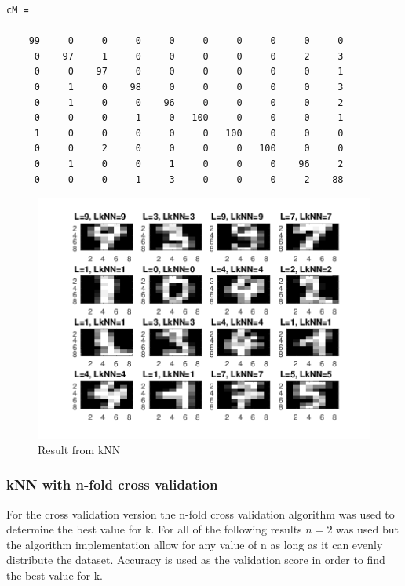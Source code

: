 \documentclass[a4paper,12pt]{article}
\begin{document}
\begin{verbatim}
cM =

    99     0     0     0     0     0     0     0     0     0
     0    97     1     0     0     0     0     0     2     3
     0     0    97     0     0     0     0     0     0     1
     0     1     0    98     0     0     0     0     0     3
     0     1     0     0    96     0     0     0     0     2
     0     0     0     1     0   100     0     0     0     1
     1     0     0     0     0     0   100     0     0     0
     0     0     2     0     0     0     0   100     0     0
     0     1     0     0     1     0     0     0    96     2
     0     0     0     1     3     0     0     0     2    88
\end{verbatim}

\begin{figure}[H]
\centering
\caption{Result from kNN}\label{fig:kNN-result}
  \begin{minipage}[]{1\textwidth}
  \includegraphics[width=\textwidth]{figures/kNN_simple.png}
  \end{minipage}
\end{figure}

\subsubsection{kNN with n-fold cross validation}

For the cross validation version the n-fold cross validation algorithm was used to determine the best value for k. For all of the following results $n = 2$ was used but the algorithm implementation allow for any value of n as long as it can evenly distribute the dataset. Accuracy is used as the validation score in order to find the best value for k.
\end{document}
